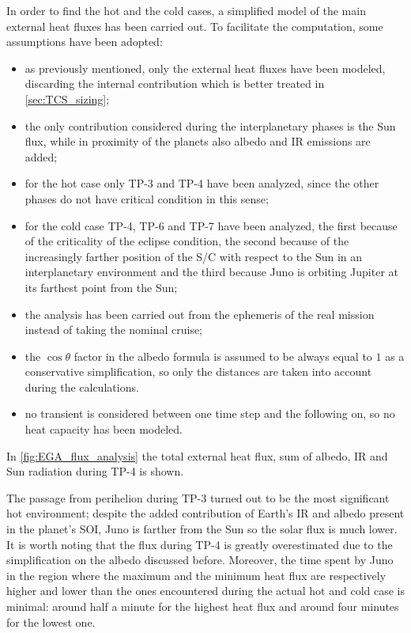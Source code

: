 In order to find the hot and the cold cases, a simplified model of the main external heat fluxes has been carried out. To facilitate the computation, some assumptions have been adopted:
\begin{itemize}
    \item as previously mentioned, only the external heat fluxes have been modeled, discarding the internal contribution which is better treated in \autoref{sec:TCS_sizing}; \\
    \item the only contribution considered during the interplanetary phases is the Sun flux, while in proximity of the planets also albedo and IR emissions are added;
    \item for the hot case only TP-3 and TP-4 have been analyzed, since the other phases do not have critical condition in this sense;
    \item for the cold case TP-4, TP-6 and TP-7 have been analyzed, the first because of the criticality of the eclipse condition, the second because of the increasingly farther position of the S/C with respect to the Sun in an interplanetary environment and the third because Juno is orbiting Jupiter at its farthest point from the Sun;
    \item the analysis has been carried out from the ephemeris of the real mission instead of taking the nominal cruise;
    \item the $\cos \theta$ factor in the albedo formula is assumed to be always equal to $1$ as a conservative simplification, so only the distances are taken into account during the calculations.
    \item no transient is considered between one time step and the following on, so no heat capacity has been modeled. 
\end{itemize}

In \autoref{fig:EGA_flux_analysis} the total external heat flux, sum of albedo, IR and Sun radiation during TP-4 is shown. 


The passage from perihelion during TP-3 turned out to be the most significant hot environment; despite the added contribution of Earth’s IR and albedo present in the planet’s SOI, Juno is farther from the Sun so the solar flux is much lower. It is worth noting that the flux during TP-4 is greatly overestimated due to the simplification on the albedo discussed before. Moreover, the time spent by Juno in the region where the maximum and the minimum heat flux are respectively higher and lower than the ones encountered during the actual hot and cold case is minimal: around half a minute for the highest heat flux and around four minutes for the lowest one.


